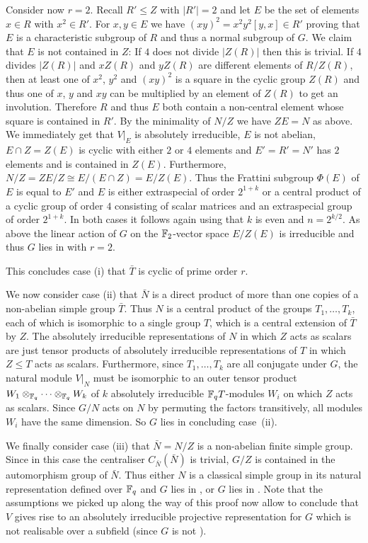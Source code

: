 Consider now $r=2$. Recall $R' \le Z$ with $|R'| = 2$ and
let $E$ be the set of elements $x \in R$ with $x^2 \in R'$. 
For $x,y \in E$ we have $(xy)^2 = x^2y^2[y,x] \in R'$ proving that
$E$ is a characteristic subgroup of $R$ and thus a normal subgroup of
$G$. We claim that $E$ is not contained in $Z$: If $4$ does not divide
$|Z(R)|$ then this is trivial. If $4$ divides $|Z(R)|$ and $xZ(R)$ and $yZ(R)$
are different elements of $R/Z(R)$, then at least one of
$x^2$, $y^2$ and $(xy)^2$ is a square in the cyclic group $Z(R)$ and
thus one of $x$, $y$ and $xy$ can be multiplied by an element of
$Z(R)$ to get an involution. Therefore $R$ and thus $E$ both contain a 
non-central element whose square is contained in $R'$.
By the minimality of $N/Z$ we have $Z E = N$ as above. We immediately
get that $V|_E$ is absolutely irreducible, $E$ is not abelian,
$E \cap Z = Z(E)$ is cyclic with either $2$ or $4$ elements and
$E' = R' = N'$ has $2$ elements and is contained in $Z(E)$.
Furthermore, $N/Z = ZE/Z \cong E/(E \cap Z) = E/Z(E)$. Thus the
Frattini subgroup $\Phi(E)$ of $E$ is equal to $E'$ and $E$ is either
extraspecial of order $2^{1+k}$ or a central product of a cyclic group
of order $4$ consisting of scalar matrices and an extraspecial group 
of order $2^{1+k}$. In both cases it follows again using
\cite[V.16.14]{Hup} that $k$ is even and
$n = 2^{k/2}$. As above the linear action of $G$ on the $\mathbb{F}_2$-vector space
$E/Z(E)$ is irreducible and thus $G$ lies in  with $r=2$.

This concludes case (i) that $\bar T$ is cyclic of prime order $r$.

We now consider case (ii) that $\bar N$ is a direct product of more than
one copies of a non-abelian simple group $\bar T$. Thus $N$ is a
central product of the groups $T_1, \ldots, T_k$, each of which is
isomorphic to a single group $T$, which is a central extension of
$\bar T$ by $Z$. The absolutely irreducible representations
of $N$ in which $Z$ acts as scalars are just tensor products of 
absolutely irreducible representations of $T$ in which $Z \le T$ acts as
scalars. Furthermore, since $T_1, \ldots, T_k$ are all conjugate under
$G$, the natural module $V|_N$ must be isomorphic to an outer tensor product
$W_1 \otimes_{\mathbb{F}_q} \cdots \otimes_{\mathbb{F}_q} W_k$ 
of $k$ absolutely irreducible $\mathbb{F}_q T$-modules $W_i$ on which $Z$
acts as scalars. Since $G/N$ acts on $N$ by permuting the factors
transitively, all modules $W_i$ have the same dimension. So $G$ lies in
 concluding case~(ii).

We finally consider case (iii) that $\bar N = N/Z$ is a non-abelian finite 
simple group. Since in this case the centraliser $C_{\bar N}(\bar N)$ is 
trivial, $G/Z$ is contained in the automorphism group of $\bar N$. 
Thus either $N$ is a classical simple group in its natural
representation defined over $\mathbb{F}_q$ and
$G$ lies in , or $G$ lies in . Note that the assumptions we
picked up along the way of this proof now allow to conclude that $V$
gives rise to an absolutely irreducible projective representation for
$G$ which is not realisable over a subfield (since $G$ is not ).
\proofend

